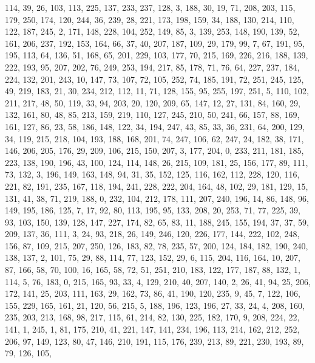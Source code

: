 \begin{DoxyCode}
       114, 39, 26, 103, 113, 225, 137, 233, 237, 128, 3, 188, 30, 19, 71, 208, 203, 115, 179, 250, 174, 120, 244,
       36, 239, 28, 221, 173, 198, 159, 34, 188, 130, 214, 110, 122, 187, 245, 2, 171, 148, 228, 104, 252, 149, 85,
       3, 139, 253, 148, 190, 139, 52, 161, 206, 237, 192, 153, 164, 66, 37, 40, 207, 187, 109, 29, 179, 99, 7, 67,
       191, 95, 195, 113, 64, 136, 51, 168, 65, 201, 229, 103, 177, 70, 215, 169, 226, 216, 188, 139, 222, 193,
       95, 207, 202, 76, 249, 253, 194, 217, 85, 178, 71, 76, 64, 227, 237, 184, 224, 132, 201, 243, 10, 147, 73,
       107, 72, 105, 252, 74, 185, 191, 72, 251, 245, 125, 49, 219, 183, 21, 30, 234, 212, 112, 11, 71, 128, 155, 95,
       255, 197, 251, 5, 110, 102, 211, 217, 48, 50, 119, 33, 94, 203, 20, 120, 209, 65, 147, 12, 27, 131, 84, 160,
       29, 132, 161, 80, 48, 85, 213, 159, 219, 110, 127, 245, 210, 50, 241, 66, 157, 88, 169, 161, 127, 86, 23,
       58, 186, 148, 122, 34, 194, 247, 43, 85, 33, 36, 231, 64, 200, 129, 34, 119, 215, 218, 104, 193, 188, 168,
       201, 74, 247, 106, 62, 247, 24, 182, 38, 171, 146, 206, 205, 176, 29, 209, 106, 215, 150, 207, 3, 177, 204, 0,
       233, 211, 181, 185, 223, 138, 190, 196, 43, 100, 124, 114, 148, 26, 215, 109, 181, 25, 156, 177, 89, 111,
       73, 132, 3, 196, 149, 163, 148, 94, 31, 35, 152, 125, 116, 162, 112, 228, 120, 116, 221, 82, 191, 235, 167,
       118, 194, 241, 228, 222, 204, 164, 48, 102, 29, 181, 129, 15, 131, 41, 38, 71, 219, 188, 0, 232, 104, 212,
       178, 111, 207, 240, 196, 14, 86, 148, 96, 149, 195, 186, 125, 7, 17, 92, 80, 113, 195, 95, 133, 208, 20, 253,
       71, 77, 225, 39, 93, 103, 150, 139, 128, 147, 227, 174, 82, 65, 83, 11, 188, 245, 155, 194, 37, 37, 59, 209,
       137, 36, 111, 3, 24, 93, 218, 26, 149, 246, 120, 226, 177, 144, 222, 102, 248, 156, 87, 109, 215, 207, 250,
       126, 183, 82, 78, 235, 57, 200, 124, 184, 182, 190, 240, 138, 137, 2, 101, 75, 29, 88, 114, 77, 123, 152,
       29, 6, 115, 204, 116, 164, 10, 207, 87, 166, 58, 70, 100, 16, 165, 58, 72, 51, 251, 210, 183, 122, 177, 187,
       88, 132, 1, 114, 5, 76, 183, 0, 215, 165, 93, 33, 4, 129, 210, 40, 207, 140, 2, 26, 41, 94, 25, 206, 172,
       141, 25, 203, 111, 163, 29, 162, 73, 86, 41, 190, 120, 235, 9, 45, 7, 122, 106, 155, 229, 165, 161, 21, 120,
       56, 215, 5, 188, 196, 123, 196, 27, 33, 24, 4, 208, 160, 235, 203, 213, 168, 98, 217, 115, 61, 214, 82, 130,
       225, 182, 170, 9, 208, 224, 22, 141, 1, 245, 1, 81, 175, 210, 41, 221, 147, 141, 234, 196, 113, 214, 162,
       212, 252, 206, 97, 149, 123, 80, 47, 146, 210, 191, 115, 176, 239, 213, 89, 221, 230, 193, 89, 79, 126, 105,

\end{DoxyCode}
